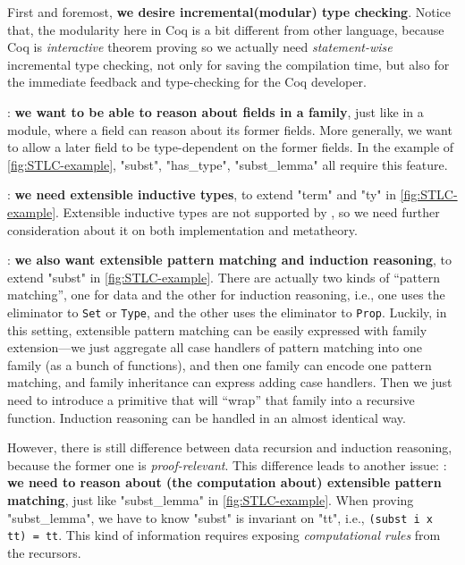 First and foremost, \textbf{we desire incremental(modular) type checking}. Notice that, the modularity here in Coq is a bit different from other language, because Coq is \textit{interactive} theorem proving so we actually need \textit{statement-wise} incremental type checking, not only for saving the compilation time, but also for the immediate feedback and type-checking for the Coq developer.

:\textbf{ we want to be able to
reason about fields in a family}, just like in a module, where a field
can reason about its former fields. More generally, we want to allow a
later field to be type-dependent on the former fields. In the example of
\cref{fig:STLC-example}, "subst", "has_type", "subst_lemma" all require
this feature.

:\textbf{ we need extensible
inductive types}, to extend "term" and "ty" in \cref{fig:STLC-example}.
Extensible inductive types are not supported by \citet{zm2017}, so
we need further consideration about it on both implementation and
metatheory.

: \textbf{we also want extensible
pattern matching and induction reasoning}, to extend "subst" in
\cref{fig:STLC-example}.
There are actually two kinds of ``pattern matching'', one for data and
the other for induction reasoning, i.e., one uses the eliminator to
\texttt{Set} or \texttt{Type}, and the other uses the
eliminator to \texttt{Prop}. Luckily, in this setting,
extensible pattern matching can be easily expressed with family
extension---we just aggregate all case handlers of pattern matching
into one family (as a bunch of functions), and then one family can
encode one pattern matching, and family inheritance can express adding
case handlers. Then we just need to introduce a primitive that will
``wrap'' that family into a recursive function. Induction reasoning can
be handled in an almost identical way. 

However, there is still difference between data recursion and induction
reasoning, because the former one is \textit{proof-relevant}. This
difference leads to another issue: :
\textbf{we need to reason about (the computation about) extensible
pattern matching}, just like "subst_lemma" in \cref{fig:STLC-example}.
When proving "subst_lemma", we have to know "subst" is invariant on
"tt", i.e., \texttt{(subst i x tt) = tt}. This kind of
information requires exposing \textit{computational rules} from the
recursors.

